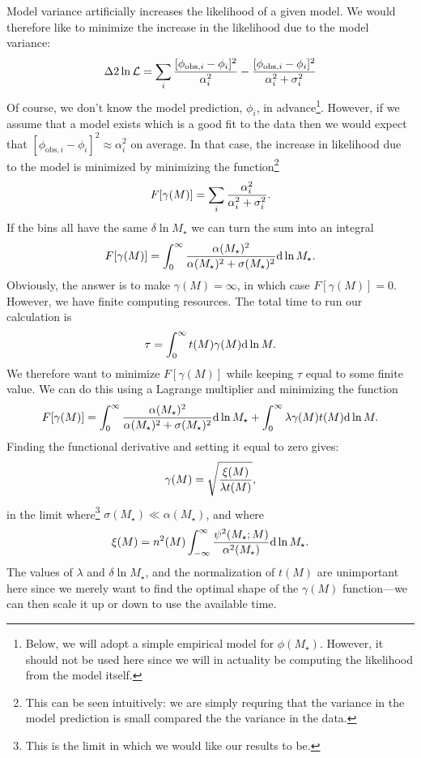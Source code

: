 Model variance artificially increases the likelihood of a given model. We would therefore like to minimize the increase in the likelihood due to the model variance:
\begin{equation}
\Delta 2 \ln \mathcal{L} = \sum_i {[\phi_{\mathrm{obs},i} - \phi_i]^2 \over \alpha_i^2} - {[\phi_{\mathrm{obs},i} - \phi_i]^2 \over \alpha_i^2 + \sigma_i^2} 
\end{equation}
Of course, we don't know the model prediction, $\phi_i$, in advance\footnote{Below, we will adopt a simple empirical model for $\phi(M_\star)$. However, it should not be used here since we will in actuality be computing the likelihood from the model itself.}. However, if we assume that a model exists which is a good fit to the data then we would expect that $[\phi_{\mathrm{obs},i} - \phi_i]^2 \approx \alpha_i^2$ on average. In that case, the increase in likelihood due to the model is minimized by minimizing the function\footnote{This can be seen intuitively: we are simply requring that the variance in the model prediction is small compared the the variance in the data.}
\begin{equation}
 F[\gamma(M)] = \sum_i {\alpha_i^2 \over \alpha_i^2 + \sigma_i^2}.
\end{equation}
If the bins all have the same $\delta \ln M_\star$ we can turn the sum into an integral
\begin{equation}
 F[\gamma(M)] = \int_0^\infty {\alpha(M_\star)^2 \over \alpha(M_\star)^2 + \sigma(M_\star)^2} \d \ln M_\star.
\end{equation}
Obviously, the answer is to make $\gamma(M)=\infty$, in which case $ F[\gamma(M)]=0$. However, we have finite computing resources. The total time to run our calculation is
\begin{equation}
 \tau = \int_0^\infty t(M) \gamma(M) \d \ln M.
\end{equation}
We therefore want to minimize $F[\gamma(M)]$ while keeping $\tau$ equal to some finite value. We can do this using a Lagrange multiplier and minimizing the function
\begin{equation}
  F[\gamma(M)] = \int_0^\infty {\alpha(M_\star)^2 \over \alpha(M_\star)^2 + \sigma(M_\star)^2} \d \ln M_\star + \int_0^\infty \lambda \gamma(M) t(M) \d \ln M.
\end{equation}
Finding the functional derivative and setting it equal to zero gives:
\begin{equation}
 \gamma(M) = \sqrt{{\xi(M) \over \lambda t(M)}},
\end{equation}
in the limit where\footnote{This is the limit in which we would like our results to be.} $\sigma(M_\star) \ll \alpha(M_\star)$, and where
\begin{equation}
 \xi(M) = n^2(M) \int_{-\infty}^\infty {\psi^2(M_\star;M) \over \alpha^2(M_\star)} \d \ln M_\star.
\end{equation}
The values of $\lambda$ and $\delta \ln M_\star$, and the normalization of $t(M)$ are unimportant here since we merely want to find the optimal shape of the $\gamma(M)$ function---we can then scale it up or down to use the available time.

